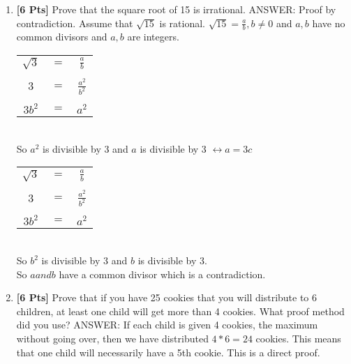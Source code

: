 \documentclass[12pt]{article}
\begin{document}
\begin{enumerate}
\item {\bf [6 Pts]} Prove that the square root of 15 is irrational.\linebreak \linebreak
ANSWER: Proof by contradiction. Assume that $\sqrt{15}$ is rational.
$\sqrt{15} = \frac{a}{b}, b \neq 0$ and $a,b$ have no common divisors and $a, b$ are integers.
\begin{table}[h]
\centering
\begin{tabular}{ccc}
$\sqrt{3}$           & $=$                  & $\frac{a}{b}$        \\
\multicolumn{1}{l}{} & \multicolumn{1}{l}{} & \multicolumn{1}{l}{} \\
$3$                  & $=$                  & $\frac{a^2}{b^2}$    \\
\multicolumn{1}{l}{} & \multicolumn{1}{l}{} & \multicolumn{1}{l}{} \\
$3b^2$               & $=$                  & $a^2$
\end{tabular}
\end{table}\\
So $a^2$ is divisible by 3 and $a$ is divisible by 3 $\leftrightarrow a = 3c$
\begin{table}[h]
\centering
\begin{tabular}{ccc}
$\sqrt{3}$           & $=$                  & $\frac{a}{b}$        \\
\multicolumn{1}{l}{} & \multicolumn{1}{l}{} & \multicolumn{1}{l}{} \\
$3$                  & $=$                  & $\frac{a^2}{b^2}$    \\
\multicolumn{1}{l}{} & \multicolumn{1}{l}{} & \multicolumn{1}{l}{} \\
$3b^2$               & $=$                  & $a^2$
\end{tabular}
\end{table}\\
So $b^2$ is divisible by 3 and $b$ is divisible by 3.\\
So $a and b$ have a common divisor which is a contradiction.


\item {\bf [6 Pts]} Prove that if you have 25 cookies that you will distribute to 6 children, at least one child will get more than 4 cookies. What proof method did you use?\linebreak \linebreak
ANSWER: If each child is given 4 cookies, the maximum without going over, then we have distributed $4*6=24$ cookies. This means that one child will necessarily have a 5th cookie. This is a direct proof.


\end{enumerate}
\end{document}
